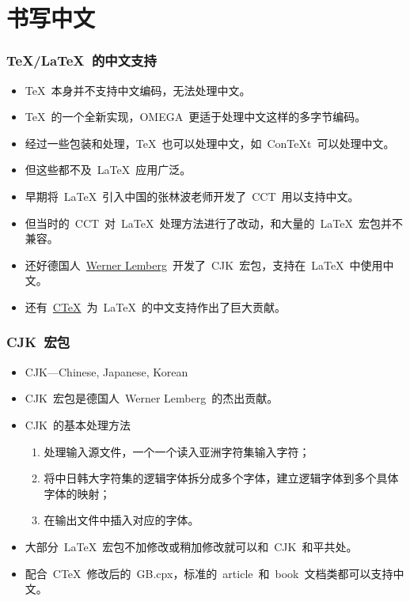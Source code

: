 \section{书写中文}

\begin{frame}
	\frametitle{\TeX/\LaTeX~的中文支持}
	\begin{itemize}[<+->]
		\item \TeX~本身并不支持中文编码，无法处理中文。
		\item \TeX~的一个全新实现，\alert{OMEGA}~更适于处理中文这样的多字节编码。
		\item 经过一些包装和处理，\TeX~也可以处理中文，如~\alert{Con\TeX{}t}~可以处理中文。
		\item 但这些都不及~\LaTeX~应用广泛。
		\item 早期将~\LaTeX~引入中国的\alert{张林波}老师开发了~\alert{CCT}~用以支持中文。
		\item 但当时的~CCT~对~\LaTeX~处理方法进行了改动，和大量的~\LaTeX~宏包并\alert{不兼容}。
		\item 还好德国人~\alert{\href{mailto:wl@gnu.org}{Werner Lemberg}}~开发了~\alert{CJK}~宏包，支持在~\LaTeX~中使用中文。
		\item 还有~\alert{\href{http://www.ctex.org}{CTeX}}~为~\LaTeX~的中文支持作出了巨大贡献。
	\end{itemize}
\end{frame}

\begin{frame}
	\frametitle{CJK~宏包}
	\begin{itemize}
		\item<2-> CJK---\alert{C}hinese, \alert{J}apanese, \alert{K}orean 
		\item<3-> CJK~宏包是德国人~Werner Lemberg~的杰出贡献。
		\item<4-> CJK~的基本处理方法
			\begin{enumerate}
				\item<5-> 处理\alert{输入}源文件，一个一个读入亚洲字符集输入字符；
				\item<6-> 将中日韩大字符集的\alert{逻辑字体拆分成多个字体}，建立逻辑字体到多个具体字体的映射；
				\item<7-> 在输出文件中插入对应的字体。
			\end{enumerate}
		\item<8-> 大部分~\LaTeX~宏包\alert{不加修改或稍加修改}就可以和~CJK~和平共处。
		\item<9-> 配合~CTeX~修改后的~\alert{GB.cpx}，标准的~article~和~book~文档类都可以支持中文。
	\end{itemize}
\end{frame}

